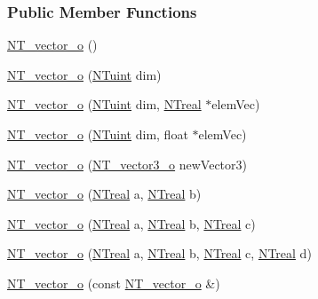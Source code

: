 \subsubsection*{Public Member Functions}
\begin{DoxyCompactItemize}
\item 
\hyperlink{class_n_t__vector__o_a8576404457d0fe0ba22b047893836244}{NT\_\-vector\_\-o} ()
\item 
\hyperlink{class_n_t__vector__o_a0c0c9014b78ff96e664a79ef4c1ce7f0}{NT\_\-vector\_\-o} (\hyperlink{nt__types_8h_ac503559f358539d91155f135ee7a365d}{NTuint} dim)
\item 
\hyperlink{class_n_t__vector__o_a95abae74e7c0155816f42280c9439c2f}{NT\_\-vector\_\-o} (\hyperlink{nt__types_8h_ac503559f358539d91155f135ee7a365d}{NTuint} dim, \hyperlink{nt__types_8h_a814a97893e9deb1eedcc7604529ba80d}{NTreal} $\ast$elemVec)
\item 
\hyperlink{class_n_t__vector__o_a1531292bf8a0f29eaac7f1f820b7590f}{NT\_\-vector\_\-o} (\hyperlink{nt__types_8h_ac503559f358539d91155f135ee7a365d}{NTuint} dim, float $\ast$elemVec)
\item 
\hyperlink{class_n_t__vector__o_adff668296f0af3134c01ea89256029ab}{NT\_\-vector\_\-o} (\hyperlink{class_n_t__vector3__o}{NT\_\-vector3\_\-o} newVector3)
\item 
\hyperlink{class_n_t__vector__o_a3ec6f04a6339ab7d8864bc1c2d95e662}{NT\_\-vector\_\-o} (\hyperlink{nt__types_8h_a814a97893e9deb1eedcc7604529ba80d}{NTreal} a, \hyperlink{nt__types_8h_a814a97893e9deb1eedcc7604529ba80d}{NTreal} b)
\item 
\hyperlink{class_n_t__vector__o_a911b51a25a6293ff03823267e70b7ce1}{NT\_\-vector\_\-o} (\hyperlink{nt__types_8h_a814a97893e9deb1eedcc7604529ba80d}{NTreal} a, \hyperlink{nt__types_8h_a814a97893e9deb1eedcc7604529ba80d}{NTreal} b, \hyperlink{nt__types_8h_a814a97893e9deb1eedcc7604529ba80d}{NTreal} c)
\item 
\hyperlink{class_n_t__vector__o_aaca0d2ebc2504fb51fe3d3be02b085a1}{NT\_\-vector\_\-o} (\hyperlink{nt__types_8h_a814a97893e9deb1eedcc7604529ba80d}{NTreal} a, \hyperlink{nt__types_8h_a814a97893e9deb1eedcc7604529ba80d}{NTreal} b, \hyperlink{nt__types_8h_a814a97893e9deb1eedcc7604529ba80d}{NTreal} c, \hyperlink{nt__types_8h_a814a97893e9deb1eedcc7604529ba80d}{NTreal} d)
\item 
\hyperlink{class_n_t__vector__o_a5dfbcfeb05cb7ba06bcdd65c144c8102}{NT\_\-vector\_\-o} (const \hyperlink{class_n_t__vector__o}{NT\_\-vector\_\-o} \&)
\item 

\end{DoxyCompactItemize}
